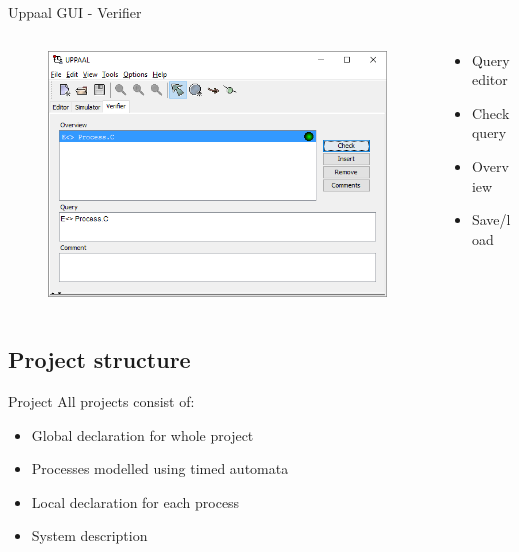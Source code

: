 \documentclass{beamer}
\begin{document}
\begin{frame}{Uppaal GUI - Verifier}
	\vspace{-5mm}
	\begin{columns}
		\begin{column}{0.8\textwidth}
			\begin{figure}[H]
				\includegraphics[scale=0.55]{img/uppaal_gui_small_verification.png}
			\end{figure}
		\end{column}
		
		\begin{column}{0.35\textwidth}
			\begin{itemize}
				\item Query editor
				\item Check query
				\item Overview
				\item Save/load
			\end{itemize}
		\end{column}
	\end{columns}		
\end{frame}

\subsection{Project structure}
\begin{frame}{Project}
	All projects consist of:
		
	\begin{itemize}
		\item Global declaration for whole project
		\item Processes modelled using timed automata
		\item Local declaration for each process
		\item System description
	\end{itemize}
\end{frame}
\end{document}
